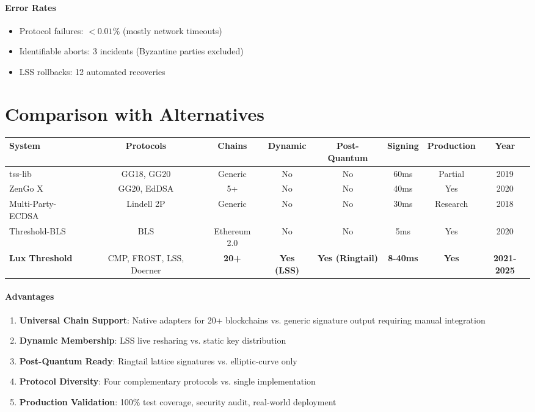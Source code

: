 \documentclass[11pt,twocolumn]{article}
\begin{document}
\paragraph{Error Rates}
\begin{itemize}
\item Protocol failures: $< 0.01\%$ (mostly network timeouts)
\item Identifiable aborts: 3 incidents (Byzantine parties excluded)
\item LSS rollbacks: 12 automated recoveries
\end{itemize}

\section{Comparison with Alternatives}

\begin{table}[t]
\centering
\small
\begin{tabular}{@{}lccccccc@{}}
\toprule
\textbf{System} & \textbf{Protocols} & \textbf{Chains} & \textbf{Dynamic} & \textbf{Post-Quantum} & \textbf{Signing} & \textbf{Production} & \textbf{Year} \\
\midrule
tss-lib \cite{tsslib} & GG18, GG20 & Generic & No & No & 60ms & Partial & 2019 \\
ZenGo X \cite{zengo} & GG20, EdDSA & 5+ & No & No & 40ms & Yes & 2020 \\
Multi-Party-ECDSA \cite{mpecdsa} & Lindell 2P & Generic & No & No & 30ms & Research & 2018 \\
Threshold-BLS \cite{tbls} & BLS & Ethereum 2.0 & No & No & 5ms & Yes & 2020 \\
\midrule
\textbf{Lux Threshold} & CMP, FROST, LSS, Doerner & \textbf{20+} & \textbf{Yes (LSS)} & \textbf{Yes (Ringtail)} & \textbf{8-40ms} & \textbf{Yes} & \textbf{2021-2025} \\
\bottomrule
\end{tabular}

\label{tab:comparison}
\end{table}

\paragraph{Advantages}
\begin{enumerate}
\item \textbf{Universal Chain Support}: Native adapters for 20+ blockchains vs. generic signature output requiring manual integration
\item \textbf{Dynamic Membership}: LSS live resharing vs. static key distribution
\item \textbf{Post-Quantum Ready}: Ringtail lattice signatures vs. elliptic-curve only
\item \textbf{Protocol Diversity}: Four complementary protocols vs. single implementation
\item \textbf{Production Validation}: 100\% test coverage, security audit, real-world deployment
\end{enumerate}
\end{document}
